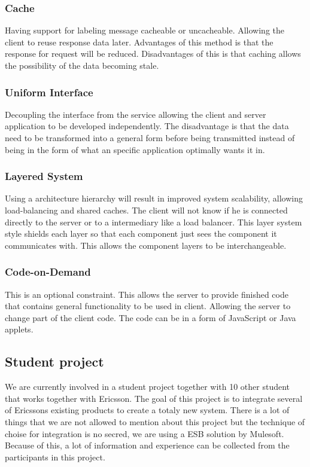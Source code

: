 \documentclass{llncs}
\begin{document}
\subsubsection{Cache}
Having support for labeling message cacheable or uncacheable. Allowing the client  to reuse response data later. Advantages of this method is that the response for request will be reduced. Disadvantages of this is that caching allows the possibility of the data becoming stale.

\subsubsection{Uniform Interface}
Decoupling the interface from the service allowing the client and server application to be developed  independently. The disadvantage is that the data need to be transformed into a general form before being transmitted instead of being in the form of what an specific application optimally wants it in.

\subsubsection{Layered System}
Using a architecture hierarchy will result in improved system scalability, allowing load-balancing and shared caches. The client will not know if he is connected directly to the server or to a intermediary like a load balancer. This layer system style shields each layer so that each component just sees the component it communicates with. This allows the component layers to be interchangeable.

\subsubsection{Code-on-Demand}
This is an optional constraint. This allows the server to provide finished code that contains general functionality to be used in client. Allowing the server to change part of the client code. The code can be in a form of JavaScript or Java applets.

\subsection{Student project}
We are currently involved in a student project together with 10 other student that works together with Ericsson. The goal of this project is to integrate several of Ericssons existing products to create a totaly new system. There is a lot of things that we are not allowed to mention about this project but the technique of choise for integration is no secred, we are using a ESB solution by Mulesoft. Because of this, a lot of information and experience can be collected from the participants in this project.
\end{document}
